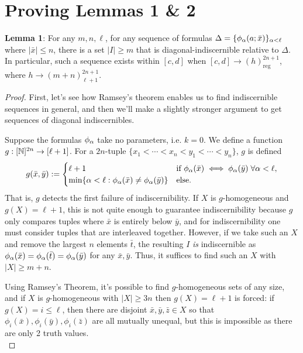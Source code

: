\documentclass{amsart}
\begin{document}
	\newpage 
	
	\section{Proving Lemmas 1 \& 2}
	
	\noindent \textbf{Lemma 1}: For any $m,n,\ell$, for any sequence of formulas $\Delta=\{\phi_{\alpha}(a;\bar{x})\}_{\alpha<\ell}$ where $|\bar{x}|\leq n$, there is a set $|I|\geq m$ that is diagonal-indiscernible relative to $\Delta$. In particular, such a sequence exists within $[c,d]$ when $[c,d]\to (h)_{\text{reg}}^{2n+1}$, where $h\to (m+n)^{2n+1}_{\ell+1}$.\\
	\begin{proof} 
		First, let's see how Ramsey's theorem enables us to find indiscernible sequences in general, and then we'll make a slightly stronger argument to get sequences of diagonal indiscernibles.
		
		Suppose the formulas $\phi_{\alpha}$ take no parameters, i.e. $k=0$. We define a function $g:[\mathbb{N}]^{2n}\to [\ell+1]$. For a $2n$-tuple $\{x_1<\cdots<x_n<y_1<\cdots<y_n\}$, $g$ is defined
		$$
		g(\bar{x},\bar{y}) := \begin{cases}
			\ell + 1 & \text{if } \phi_{\alpha}(\bar{x})\iff \phi_{\alpha}(\bar{y}) \; \forall \alpha<\ell,\\
			\min \{\alpha<\ell : \phi_{\alpha}(\bar{x}) \neq \phi_{\alpha}(\bar{y})\} & \text{else}.
		\end{cases}
		$$
		That is, $g$ detects the first failure of indiscernibility. If $X$ is $g$-homogeneous and $g(X)=\ell + 1$, this is not quite enough to guarantee indiscernibility because $g$ only compares tuples where $\bar{x}$ is entirely below $\bar{y}$, and for indiscernibility one must consider tuples that are interleaved together. However, if we take such an $X$ and remove the largest $n$ elements $\bar{t}$, the resulting $I$ \textit{is} indiscernible as $\phi_{\alpha}(\bar{x})=\phi_{\alpha}(\bar{t})=\phi_{\alpha}(\bar{y})$ for any $\bar{x},\bar{y}$. Thus, it suffices to find such an $X$ with $|X|\geq m+n$.
		
		Using Ramsey's Theorem, it's possible to find $g$-homogeneous sets of any size, and if $X$ is $g$-homogeneous with $|X|\geq 3n$ then $g(X)=\ell+1$ is forced: if $g(X)=i\leq \ell$, then there are disjoint $\bar{x},\bar{y},\bar{z}\in X$ so that $\phi_i(\bar{x}),\phi_i(\bar{y}),\phi_i(\bar{z})$ are all mutually unequal, but this is impossible as there are only 2 truth values.\\
		

\end{proof}
\end{document}
